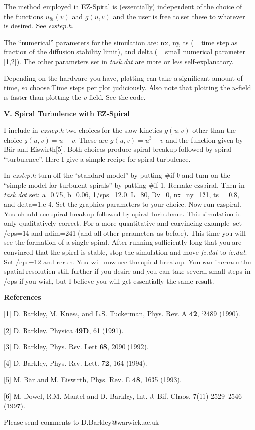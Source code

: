 \documentclass[12pt]{article}
\begin{document}
The method employed in EZ-Spiral is (essentially) independent of the
choice of the functions $u_{th}(v)$ and $g(u,v)$ and the user is free
to set these to whatever is desired.  See {\em ezstep.h}.

The ``numerical'' parameters for the simulation are: {\sf nx}, {\sf ny}, {\sf
ts} (= time step as fraction of the diffusion stability limit), and {\sf
delta} (= small numerical parameter [1,2]).  The other parameters set in {\em
task.dat} are more or less self-explanatory.

Depending on the hardware you have, plotting can take a significant amount of
time, so choose {\sf Time steps per plot} judiciously.  Also note that
plotting the $u$-field is faster than plotting the $v$-field. See the code.

{\bf V. Spiral Turbulence with EZ-Spiral} 

I include in {\em ezstep.h} two choices for the slow kinetics $g(u,v)$
other than the choice $g(u,v) = u-v$.  These are $g(u,v) = u^3-v$ and
the function given by B\"ar and Eiswirth[5].  Both choices produce
spiral breakup followed by spiral ``turbulence''.  Here I give a
simple recipe for spiral turbulence.

In {\em ezstep.h} turn off the ``standard model'' by putting {\sf \#if
0} and turn on the ``simple model for turbulent spirals'' by putting
{\sf \#if 1}.  Remake ezspiral.  Then in {\em task.dat} set: {\sf
a=0.75, b=0.06, 1/eps=12.0, L=80, Dv=0, nx=ny=121, ts = 0.8}, and {\sf
delta=1.e-4}.  Set the graphics parameters to your choice.  Now run
ezspiral.  You should see spiral breakup followed by spiral
turbulence. This simulation is only qualitatively correct.  For a more
quantitative and convincing example, set {/eps=14} and {\sf
ndim=241} (and all other parameters as before).  This time you will
see the formation of a single spiral.  After running sufficiently long
that you are convinced that the spiral is stable, stop the simulation
and move {\em fc.dat} to {\em ic.dat}.  Set {/eps=12} and
rerun.  You will now see the spiral breakup.  You can increase the
spatial resolution still further if you desire and you can take
several small steps in {/eps} if you wish, but I believe you will
get essentially the same result.


{\bf References} 

[1] D. Barkley, M. Kness, and L.S. Tuckerman, Phys. Rev. A {\bf 42}, 
`2489 (1990).

[2] D. Barkley, Physica {\bf 49D}, 61 (1991).

[3] D. Barkley, Phys. Rev. Lett {\bf 68}, 2090 (1992).

[4] D. Barkley, Phys. Rev. Lett. {\bf 72}, 164 (1994).

[5] M. B\"ar and  M. Eiswirth, Phys. Rev. E {\bf 48}, 1635 (1993).

[6] M. Dowel, R.M. Mantel and D. Barkley, Int. J. Bif. Chaos, 7(11) 2529--2546
(1997).

Please send comments to D.Barkley@warwick.ac.uk
\end{document}
